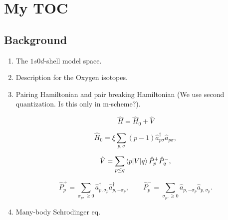 \documentclass[aps,prl,reprint,groupedaddress]{revtex4-1}  %
\begin{document}
\section{My TOC}

\subsection{Background}
\begin{enumerate}
	\item The $1s0d$-shell model space.
	\item Description for the Oxygen isotopes.
	\item Pairing Hamiltonian and pair breaking Hamiltonian (We use second quantization. Is this only in m-scheme?).
	
		\begin{equation} \label{eq:H}
		\hat H = \hat H_0 + \hat V
		\end{equation}
				
		\begin{equation} \label{eq:H_0}
		\hat H_0 = \xi \sum_{p,\sigma} (p-1) \hat a_{p\sigma}^\dagger \hat a_{p\sigma},
		\end{equation}
		
		\begin{equation} \label{eq:V}
		\hat V = \sum_{p \leq q} \braket{p|V|q}\hat P_p^+ \hat P_q^- ,
		\end{equation}
		
		\begin{equation} \label{eq:P}
		\hat P_p^+ = \sum_{\sigma_p, \geq 0} \hat a_{p, \sigma_p}^\dagger \hat a_{p, -\sigma_p}^\dagger, \qquad
		\hat P_p^- = \sum_{\sigma_p, \geq 0} \hat a_{p, -\sigma_p} \hat a_{p, \sigma_p}.
		\end{equation}
	\item Many-body Schrodinger eq.
\end{enumerate}
\end{document}
